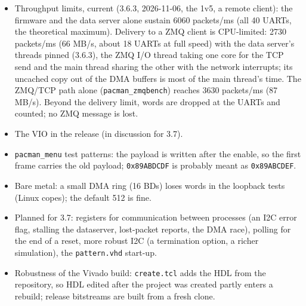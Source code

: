 \documentclass[11pt]{article}
\newcommand{\h}[1]{\texttt{#1}}
\begin{document}
\begin{itemize}
\begin{itemize}
  \item Why 1111:  the AXI DMA (no multi-channel) issues AxCACHE 0011 and offers no software control of it.  Zynq
    Linux sets the PL310's shared-override bit (aux bit 22), so 0011 is non-cacheable at the L2 and bypasses it.  The
    SCU keeps L1 coherent, but L2 lines go stale both ways.  On the bench (patch 172, 0011) the first transfers
    passed, then stale descriptors and data:  scatter-gather internal errors on both engines, and nothing delivered.
  \item Software (scratch \h{acp/sw} 2ab484b, from 3.6.3):  the DMA region is mapped through \h{/dev/mem} without
    \h{O\_SYNC} (cached, write-back, shared:  on kernel 6.1 the no-map region is \h{pfn\_valid}), and the registers
    stay uncached.  A \h{dsb} goes before the DMA register writes (descriptors reach the DMA first), and a \h{dmb}
    goes between a descriptor's completion and reading its data.  No cache maintenance calls.
  \item Results on the 173 image:  fwcheck 30 of 30, hwcheck \h{--read\_only} PASS, 0 lost messages, no DMA errors.
    The official (uncached) apps also pass on the ACP firmware.  Logs in augie's \h{pacman/fw-items/acp-demo}.
  \end{itemize}
\item Throughput limits, current (3.6.3, 2026-11-06, the 1v5, a remote client):  the firmware and the data server
  alone sustain 6060 packets/ms (all 40 UARTs, the theoretical maximum).  Delivery to a ZMQ client is CPU-limited:
  2730 packets/ms (66 MB/s, about 18 UARTs at full speed) with the data server's threads pinned (3.6.3), the ZMQ
  I/O thread taking one core for the TCP send and the main thread sharing the other with the network interrupts;
  its uncached copy out of the DMA buffers is most of the main thread's time.  The ZMQ/TCP path alone
  (\h{pacman\_zmqbench}) reaches 3630 packets/ms (87 MB/s).  Beyond the delivery limit, words are dropped at the
  UARTs and counted;  no ZMQ message is lost.
\item The VIO in the release (in discussion for 3.7).
\item \h{pacman\_menu} test patterns: the payload is written after the enable, so the first frame carries the old
  payload; \h{0x89ABDCDF} is probably meant as \h{0x89ABCDEF}.
\item Bare metal: a small DMA ring (16 BDs) loses words in the loopback tests (Linux copes); the default 512 is fine.
\item Planned for 3.7: registers for communication between processes (an I2C error flag, stalling the dataserver,
  lost-packet reports, the DMA race), polling for the end of a reset, more robust I2C (a termination option, a richer
  simulation), the \h{pattern.vhd} start-up.
\item Robustness of the Vivado build: \h{create.tcl} adds the HDL from the repository, so HDL edited after the
  project was created partly enters a rebuild; release bitstreams are built from a fresh clone.
\end{itemize}
\end{document}
